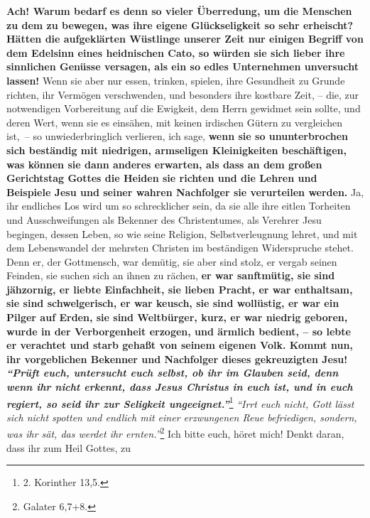 \medskip

\label{ref:18_11_ueberredung}
\textbf{Ach! Warum bedarf es denn so vieler Überredung, um die Menschen zu dem
zu
bewegen, was ihre eigene Glückseligkeit so sehr erheischt? Hätten die
aufgeklärten Wüstlinge unserer Zeit nur einigen Begriff von dem Edelsinn eines
heidnischen Cato, so würden sie sich lieber ihre
sinnlichen Genüsse
versagen, als ein so edles Unternehmen unversucht lassen!} Wenn sie aber nur
essen, trinken, spielen, ihre Gesundheit zu Grunde richten, ihr Vermögen
verschwenden, und besonders ihre kostbare Zeit, -- die, zur notwendigen
Vorbereitung auf die Ewigkeit, dem Herrn gewidmet sein sollte, und deren Wert,
wenn sie es einsähen, mit keinen irdischen Gütern zu vergleichen ist,~-- so
unwiederbringlich verlieren, ich sage, \textbf{wenn sie so ununterbrochen sich
beständig mit niedrigen, armseligen Kleinigkeiten beschäftigen, was können sie
dann anderes erwarten, als dass an dem großen Gerichtstag Gottes die
Heiden sie
richten und die Lehren und Beispiele Jesu und seiner wahren Nachfolger sie
verurteilen werden.} Ja, ihr endliches Los wird um so schrecklicher sein, da
sie alle ihre eitlen Torheiten und Ausschweifungen als Bekenner des
Christentumes, als Verehrer Jesu begingen, dessen Leben, so wie seine
Religion, Selbstverleugnung lehret, und mit dem Lebenswandel der mehrsten
Christen im beständigen Widerspruche stehet. Denn er, der
Gottmensch, war
demütig, sie aber sind stolz, er vergab seinen Feinden, sie suchen sich an
ihnen zu rächen, \textbf{er war sanftmütig, sie sind jähzornig, er liebte
Einfachheit,
sie lieben Pracht, er war enthaltsam, sie sind schwelgerisch, er war keusch, sie
sind wollüstig, er war ein Pilger auf Erden, sie sind Weltbürger, kurz, er war
niedrig geboren, wurde in der Verborgenheit erzogen, und ärmlich bedient, -- so
lebte er verachtet und starb gehaßt von seinem eigenen Volk. Kommt nun, ihr
vorgeblichen Bekenner und Nachfolger dieses gekreuzigten Jesu!
\textit{"`Prüft euch,
untersucht euch selbst, ob ihr im Glauben seid, denn wenn ihr nicht erkennt,
dass Jesus Christus in euch ist, und in euch regiert, so seid ihr zur
Seligkeit ungeeignet."'}}\footnote{2. Korinther 13,5.}
\textit{"`Irrt euch
nicht, Gott lässt sich nicht spotten und endlich mit einer erzwungenen Reue
befriedigen, sondern, was ihr sät, das werdet ihr ernten."'}\footnote{Galater
6,7+8.}
Ich bitte euch, höret mich! Denkt daran, dass ihr zum Heil Gottes, zu
